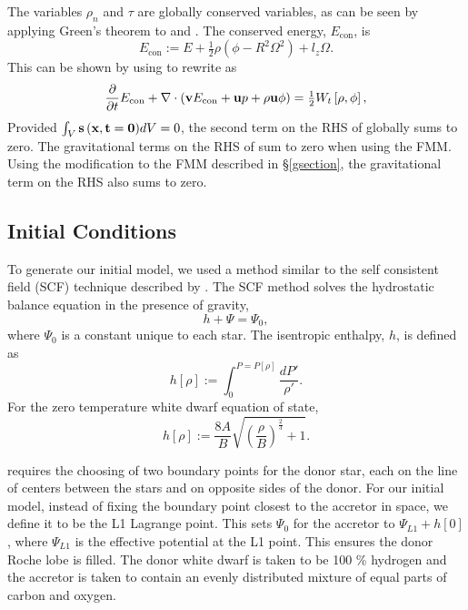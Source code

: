 \documentclass[preprint]{aastex}
\begin{document}
The variables $\rho_n$ and $\tau$ are globally conserved variables, as can be seen by applying Green's theorem to  and . The conserved energy,  $E_{\mathrm{con}}$, is 
\begin{equation}
E_{\mathrm{con}} := E + \tfrac{1}{2} \rho \left( \phi - R^2 \Omega^2 \right) + l_z \Omega.
\end{equation}
This can be shown by using  to rewrite  as
\begin{equation} 
\label{econ_eq}
\frac{\partial}{\partial t} E_{\mathrm{con}}  + {\bf{\nabla }} \cdot  \left( {\bf{v}} E_{\mathrm{con}} +  {\bf{u}} p + \rho {\bf{u}} \phi \right) = \tfrac{1}{2} W_t \left[ \rho, \phi \right], 
\end{equation}
Provided $\int_V {\bf{s\left({ {\bf{x}} }, t=0\right)}} dV = 0$, the second term on the RHS of  globally sums to zero. The gravitational terms on the RHS of  sum to zero when using the
FMM. Using the modification to the FMM described in \S \ref{gsection}, the gravitational term on the RHS  also sums to zero. 
 

\subsection{Initial Conditions}
To generate our initial model, we used a method similar to the self consistent field (SCF) technique described by \cite{ET2009}. The SCF method solves the hydrostatic balance equation in the presence of gravity,
\begin{equation}
h + \Psi = \Psi_0,
\end{equation}
where $\Psi_0$ is a constant unique to each star. The isentropic enthalpy, $h$, is defined as 
\begin{equation}
\label{hbal}
h\left[\rho\right] := \int_0^{P=P\left[\rho\right]} \frac{dP'}{\rho'}.
\end{equation}
For the zero temperature white dwarf equation of state, 
\begin{equation} 
h\left[\rho\right] := \frac{8 A}{B}\sqrt{ \left(\frac{\rho}{B}\right)^\frac{2}{3} + 1} .
\end{equation}

\cite{ET2009} requires the choosing of two boundary points for the donor star, each on the line of centers between the stars and on opposite sides of the donor. For our initial model,
instead of fixing the boundary point closest to the accretor in space, we define it to be the L1 Lagrange point. This sets $\Psi_0$ for the accretor to $\Psi_{L1} + h\left[0\right]$, where $\Psi_{L1}$ is the effective potential at the L1 point. This ensures the donor Roche lobe is filled. The donor white dwarf is taken to be 100 \% hydrogen and the accretor is taken to contain an evenly distributed mixture of 
equal parts of carbon and oxygen.
\end{document}
